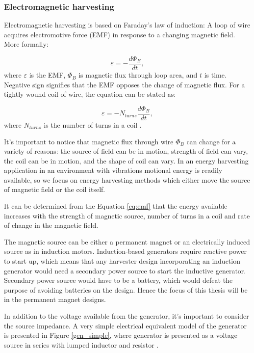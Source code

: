 \subsubsection{Electromagnetic harvesting} \label{sect:em_harvest}
Electromagnetic harvesting is based on Faraday's law of induction: A loop of wire acquires electromotive force (EMF) in response to a changing magnetic field. More formally:

\begin{equation}
  \varepsilon = - \frac{d \Phi_ {B}}{d t} , 
\end{equation}
where $\varepsilon$ is the EMF, $\Phi_{B}$ is magnetic flux through loop area, and $t$ is time. Negative sign signifies that the EMF opposes the change of magnetic flux. For a tightly wound coil of wire, the equation can be stated as: 

\begin{equation} \label{eq:emf}
  \varepsilon = -N_{turns} \frac{d \Phi_{B}}{d t} , 
\end{equation}
where $N_{turns}$ is the number of turns in a coil \cite[p.998]{universityphysics}.

It's important to notice that magnetic flux through wire $ \Phi_{B} $ can change for a variety of reasons: the source of field can be in motion, strength of field can vary, the coil can be in motion, and the shape of coil can vary. In an energy harvesting application in an environment with vibrations motional energy is readily available, so we focus on energy harvesting methods which either move the source of magnetic field or the coil itself.

It can be determined from the Equation \eqref{eq:emf} that the energy available increases with the strength of magnetic source, number of turns in a coil and rate of change in the magnetic field. 

The magnetic source can be either a permanent magnet or an electrically induced source as in induction motors. Induction-based generators require reactive power to start up, which means that any harvester design incorporating an induction generator would need a secondary power source to start the inductive generator. Secondary power source would have to be a battery, which would defeat the purpose of avoiding batteries on the design. Hence the focus of this thesis will be in the permanent magnet designs.

In addition to the voltage available from the generator, it's important to consider the source impedance. A very simple electrical equivalent model of the generator is presented in Figure \ref{gen_simple}, where generator is presented as a voltage source in series with lumped inductor and resistor \cite{Jirutitijaroen2012}. 


